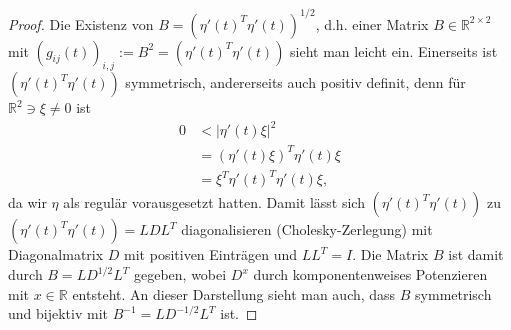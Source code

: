 \documentclass[12pt,a4paper]{scrartcl}
\numberwithin{equation}{section}
\newcommand{\R}{\mathbb{R}} %
\begin{document}
\begin{proof}
Die Existenz von $B=(\eta'(t)^T\eta'(t))^{1/2}$, d.h. einer Matrix $B \in \R^{2 \times 2}$ mit $(g_{ij}(t))_{i,j}:=B^2= (\eta'(t)^T\eta'(t))$ sieht man leicht ein. Einerseits ist $(\eta'(t)^T\eta'(t))$ symmetrisch, andererseits auch positiv definit, denn für $\R^2 \ni \xi \neq 0$ ist
\begin{align*}
0 &< |\eta'(t) \xi|^2  \\
&= (\eta'(t)\xi)^T  \eta'(t)\xi \\
&= \xi^T \eta'(t)^T \eta'(t) \xi,
\end{align*}
da wir $\eta$ als regulär vorausgesetzt hatten. Damit lässt sich $(\eta'(t)^T\eta'(t))$ zu $(\eta'(t)^T\eta'(t))= L D L^T$  diagonalisieren (Cholesky-Zerlegung) mit Diagonalmatrix $D$ mit positiven Einträgen und $L L^T = I$.
Die Matrix $B$ ist damit durch $B= L D^{1/2} L^T$ gegeben, wobei $D^x$ durch komponentenweises Potenzieren mit $x\in \R$ entsteht. An dieser Darstellung sieht man auch, dass $B$ symmetrisch und bijektiv mit $B^{-1}=L D^{-1/2} L^T$ ist. 


\end{proof}
\end{document}
